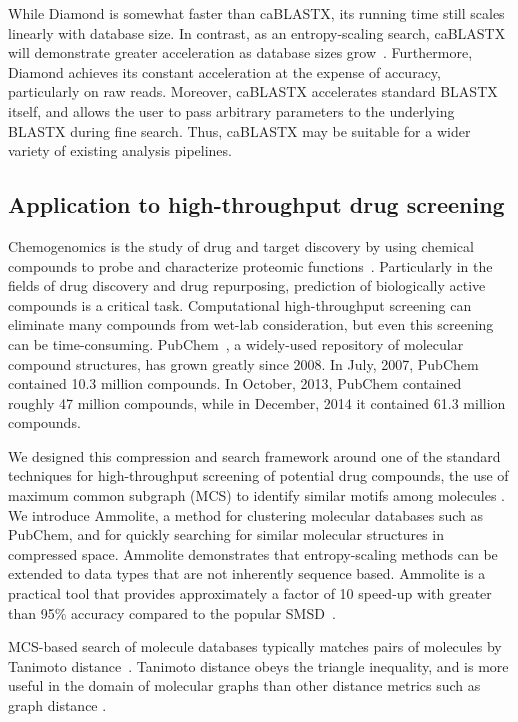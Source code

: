 \documentclass[review,preprint,12pt]{elsarticle}
\renewcommand{\cite}{\citep} %
\theoremstyle{definition}
\theoremstyle{remark}
\numberwithin{equation}{section}
\begin{document}
While Diamond is somewhat faster than caBLASTX, its running time still scales
linearly with database size.
In contrast, as an entropy-scaling search, caBLASTX will demonstrate greater
acceleration as database sizes grow~\cite{daniels2013compressive}.
Furthermore, Diamond achieves its constant acceleration at the expense of 
accuracy, particularly on raw reads.
Moreover, caBLASTX accelerates standard BLASTX itself, and allows the
user to pass arbitrary parameters to the underlying BLASTX during fine search.
Thus, caBLASTX may be suitable for a wider variety of existing analysis 
pipelines.

\subsection{Application to high-throughput drug screening}

Chemogenomics is the study of drug and target discovery by using chemical
compounds to probe and characterize proteomic 
functions~\cite{bredel2004chemogenomics}.
Particularly in the fields of drug discovery and drug repurposing, prediction 
of biologically active compounds is a critical task. 
Computational high-throughput screening can eliminate many compounds from 
wet-lab consideration, but even this screening can be time-consuming.
PubChem~\cite{bolton2008pubchem}, a widely-used repository of molecular compound 
structures, 
has grown greatly since 2008. 
In July, 2007, PubChem contained 10.3 million compounds.
In October, 2013, PubChem contained roughly 47 million compounds, while
in December, 2014 it contained 61.3 million compounds.

We designed this compression and search framework around one of the standard 
techniques for high-throughput screening of potential drug compounds, the use 
of maximum common subgraph (MCS) to identify similar motifs among molecules \cite{cao2008maximum, rahman2009small}.
We introduce Ammolite, a method for clustering molecular databases such as 
PubChem, and for quickly searching for 
similar molecular structures in compressed space.
Ammolite demonstrates that entropy-scaling methods can be extended to data types that are not inherently sequence based.
Ammolite is a practical 
tool that provides approximately a factor of 10 speed-up with greater than 95\% accuracy compared to the popular SMSD~\cite{rahman2009small}.

MCS-based search of molecule databases typically matches pairs of molecules by 
Tanimoto distance~\cite{rahman2009small}. 
Tanimoto distance obeys the triangle inequality, and is more useful in the 
domain of molecular graphs than other
distance metrics such as graph distance \cite{bunke1998graph}.
\end{document}
